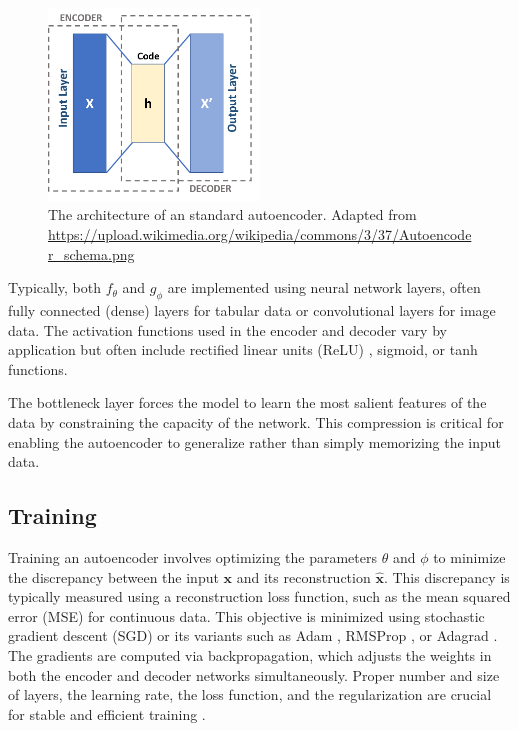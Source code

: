\begin{figure}[ht]
  \centering
  \includegraphics[width=0.50\textwidth]{images/Autoencoder_schema.png}
  \caption{The architecture of an standard autoencoder. Adapted from \url{https://upload.wikimedia.org/wikipedia/commons/3/37/Autoencoder_schema.png}}
  \label{fig:autoencoder}
\end{figure}

Typically, both $f_{\theta}$ and $g_{\phi}$ are implemented using neural network layers, often fully connected (dense) layers for tabular data or convolutional layers for image data. The activation functions used in the encoder and decoder vary by application but often include rectified linear units (ReLU) \cite{ReLU}, sigmoid, or tanh functions.

The bottleneck layer forces the model to learn the most salient features of the data by constraining the capacity of the network. This compression is critical for enabling the autoencoder to generalize rather than simply memorizing the input data.

\subsection{Training}

Training an autoencoder involves optimizing the parameters $\theta$ and $\phi$ to minimize the discrepancy between the input $\mathbf{x}$ and its reconstruction $\hat{\mathbf{x}}$. This discrepancy is typically measured using a reconstruction loss function, such as the mean squared error (MSE) for continuous data. This objective is minimized using stochastic gradient descent (SGD) or its variants such as Adam \cite{Adam}, RMSProp \cite{RMSProp}, or Adagrad \cite{Adagrad}. The gradients are computed via backpropagation, which adjusts the weights in both the encoder and decoder networks simultaneously. Proper number and size of layers, the learning rate, the loss function, and the regularization are crucial for stable and efficient training \cite{Berahmand24}.

